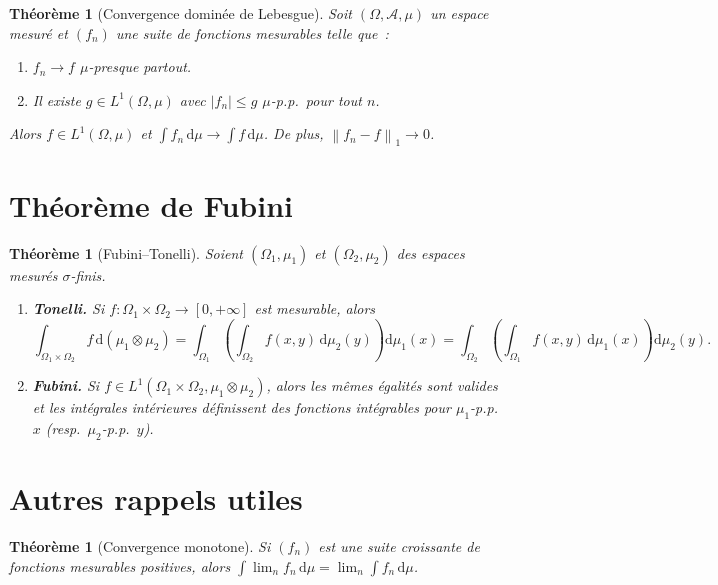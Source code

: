 \documentclass[a4paper,12pt]{book}
\newcommand{\dd}{\mathrm{d}}
\newcommand{\norm}[1]{\left\| #1 \right\|}
\newcommand{\abs}[1]{\left| #1 \right|}
\theoremstyle{definition}
\theoremstyle{plain}
\newtheorem{theoreme}[definition]{Théorème}
\theoremstyle{remark}
\begin{document}
\begin{theoreme}[Convergence dominée de Lebesgue]
\label{thm:conv-dominee}
Soit $(\Omega, \mathcal{A}, \mu)$ un espace mesuré et $(f_n)$ une suite de fonctions
mesurables telle que~:
\begin{enumerate}[label=(\roman*)]
  \item $f_n \to f$ $\mu$-presque partout.
  \item Il existe $g \in L^1(\Omega, \mu)$ avec $\abs{f_n} \le g$ $\mu$-p.p.\ pour tout $n$.
\end{enumerate}
Alors $f \in L^1(\Omega, \mu)$ et $\int f_n\,\dd\mu \to \int f\,\dd\mu$. De plus,
$\norm{f_n - f}_1 \to 0$.
\end{theoreme}

\section{Théorème de Fubini}

\begin{theoreme}[Fubini--Tonelli]
\label{thm:fubini}
Soient $(\Omega_1, \mu_1)$ et $(\Omega_2, \mu_2)$ des espaces mesurés $\sigma$-finis.
\begin{enumerate}[label=(\roman*)]
  \item \textbf{Tonelli.} Si $f : \Omega_1 \times \Omega_2 \to [0, +\infty]$ est
        mesurable, alors
        \[
          \int_{\Omega_1 \times \Omega_2} f\,\dd(\mu_1 \otimes \mu_2)
            = \int_{\Omega_1}\left(\int_{\Omega_2} f(x,y)\,\dd\mu_2(y)\right)\dd\mu_1(x)
            = \int_{\Omega_2}\left(\int_{\Omega_1} f(x,y)\,\dd\mu_1(x)\right)\dd\mu_2(y).
        \]
  \item \textbf{Fubini.} Si $f \in L^1(\Omega_1 \times \Omega_2, \mu_1 \otimes \mu_2)$,
        alors les mêmes égalités sont valides et les intégrales intérieures définissent des
        fonctions intégrables pour $\mu_1$-p.p.\ $x$ (resp.\ $\mu_2$-p.p.\ $y$).
\end{enumerate}
\end{theoreme}

\section{Autres rappels utiles}

\begin{theoreme}[Convergence monotone]
\label{thm:conv-monotone}
Si $(f_n)$ est une suite croissante de fonctions mesurables positives, alors
$\int \lim_n f_n\,\dd\mu = \lim_n \int f_n\,\dd\mu$.
\end{theoreme}
\end{document}
